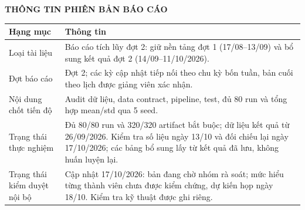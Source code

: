 \documentclass[12pt,a4paper,oneside]{report}
\begin{document}
\thispagestyle{empty}
\vspace*{-1.05cm}
\begin{center}{\bfseries\fontsize{16pt}{20pt}\selectfont\color{HCMUTEDark} THÔNG TIN PHIÊN BẢN BÁO CÁO}\end{center}
\vspace{0.25cm}
\begingroup\fontsize{10.5pt}{13pt}\selectfont\renewcommand{\arraystretch}{1.5}
\begin{tabularx}{\textwidth}{L{4.2cm}Y}\toprule
\textbf{Hạng mục} & \textbf{Thông tin}\\\midrule
Loại tài liệu & Báo cáo tích lũy đợt 2: giữ nền tảng đợt 1 (17/08--13/09) và bổ sung kết quả đợt 2 (14/09--11/10/2026).\\
Đợt báo cáo & Đợt 2; các kỳ cập nhật tiếp nối theo chu kỳ bốn tuần, bản cuối theo lịch được giảng viên xác nhận.\\
Nội dung chốt tiến độ & Audit dữ liệu, data contract, pipeline, test, đủ 80 run và tổng hợp mean/std qua 5 seed.\\
Trạng thái thực nghiệm & Đủ 80/80 run và 320/320 artifact bắt buộc; dữ liệu kết quả từ 26/09/2026. Kiểm tra số liệu ngày 13/10 và đối chiếu lại ngày 17/10/2026; các bảng bổ sung lấy từ kết quả đã lưu, không huấn luyện lại.\\
Trạng thái kiểm duyệt nội bộ & Cập nhật 17/10/2026: bản đang chờ nhóm rà soát; mức hiểu từng thành viên chưa được kiểm chứng, dự kiến họp ngày 18/10. Kiểm tra kỹ thuật được ghi riêng.\\
\bottomrule\end{tabularx}\endgroup
\vspace{0.35cm}
\par
\clearpage
{}
\setcounter{page}{1}
\begingroup\fontsize{10pt}{12pt}\selectfont{}\tableofcontents\endgroup
\clearpage
{}
\begingroup\fontsize{10pt}{12pt}\selectfont{}
\par\vspace{0.45cm}
\makeatletter{}\makeatother
\endgroup\clearpage
{}
\begingroup\fontsize{10pt}{12pt}\selectfont{}
\par\vspace{0.45cm}
\makeatletter{}\makeatother
\endgroup\clearpage
\end{document}
